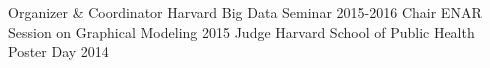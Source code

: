 \begin{cvinvolves}
  \cvinvolve
    {Organizer \& Coordinator} %
    {Harvard Big Data Seminar} %
    {} %
    {2015-2016} %
  \cvinvolve
    {Chair} %
    {ENAR Session on Graphical Modeling} %
    {} %
    {2015} %
  \cvinvolve
    {Judge} %
    {Harvard School of Public Health Poster Day} %
    {} %
    {2014} %

\end{cvinvolves}
